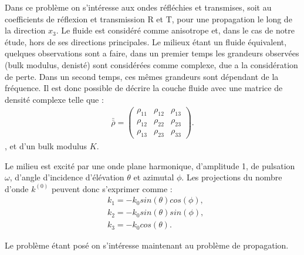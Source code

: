 \documentclass[12pt]{report}
\begin{document}
    Dans ce problème on s'intéresse aux ondes réfléchies et transmises, soit au coefficients de réflexion et transmission R et T, pour une propagation le long de la direction $x_3$.
    Le fluide est considéré comme anisotrope et, dans le cas de notre étude, hors de ses directions principales. Le milieux étant un fluide équivalent, quelques observations sont a faire, dans un premier temps les grandeurs observées (bulk modulus, denisté) sont considérées comme complexe, due a la considération de perte. Dans un second temps, ces mêmes grandeurs sont dépendant de la fréquence.
    Il est donc possible de décrire la couche fluide avec une matrice de densité complexe telle que :
    \begin{align}
    \bar{\bar{\rho}}=\begin{pmatrix}
    					\rho_{11} & \rho_{12} & \rho_{13} \\
                        \rho_{12} & \rho_{22} & \rho_{23} \\
                        \rho_{13} & \rho_{23} & \rho_{33}                       
    				 \end{pmatrix}.
    \end{align},
    et d'un bulk modulus $K$.
    
    Le milieu est excité par une onde plane harmonique, d'amplitude 1, de pulsation $\omega$, d'angle d'incidence d'élévation $\theta$ et azimutal $\phi$. Les projections du nombre d'onde $k^{(0)}$ peuvent donc s'exprimer comme : 
        \begin{align}
        &k_1=-k_0 sin(\theta) cos(\phi), \\
        &k_2=-k_0 sin(\theta) sin(\phi), \\
        &k_3= -k_0 cos(\theta).
        \end{align}
        
        Le problème étant posé on s'intéresse maintenant au problème de propagation.
        
\end{document}
